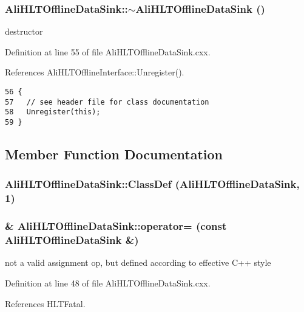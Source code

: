 \subsubsection{\setlength{\rightskip}{0pt plus 5cm}Ali\-HLTOffline\-Data\-Sink::$\sim${\bf Ali\-HLTOffline\-Data\-Sink} ()\hspace{0.3cm}{\tt  [virtual]}}\label{classAliHLTOfflineDataSink_a3}


destructor 

Definition at line 55 of file Ali\-HLTOffline\-Data\-Sink.cxx.

References Ali\-HLTOffline\-Interface::Unregister().

\footnotesize\begin{verbatim}56 {
57   // see header file for class documentation
58   Unregister(this);
59 }
\end{verbatim}\normalsize 




\subsection{Member Function Documentation}
\subsubsection{\setlength{\rightskip}{0pt plus 5cm}Ali\-HLTOffline\-Data\-Sink::Class\-Def ({\bf Ali\-HLTOffline\-Data\-Sink}, 1)\hspace{0.3cm}{\tt  [private]}}\label{classAliHLTOfflineDataSink_d0}


\subsubsection{ \& Ali\-HLTOffline\-Data\-Sink::operator= (const {\bf Ali\-HLTOffline\-Data\-Sink} \&)}\label{classAliHLTOfflineDataSink_a2}


not a valid assignment op, but defined according to effective C++ style 

Definition at line 48 of file Ali\-HLTOffline\-Data\-Sink.cxx.

References HLTFatal.

